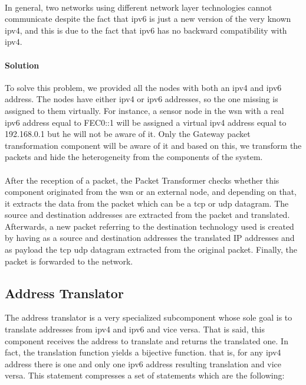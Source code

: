 \documentclass[oneside,12pt,a4paper,final]{book}
\begin{document}
\paragraph{}

In general, two networks using different network layer technologies cannot communicate despite the fact that \gls{ipv6} is just a new version of the very known \gls{ipv4}, and this is due to the fact that \gls{ipv6} has no backward compatibility with \gls{ipv4}.
\paragraph{Solution}
To solve this problem, we provided all the nodes with both an \gls{ipv4} and \gls{ipv6} address. The nodes have either \gls{ipv4} or \gls{ipv6} addresses, so the one missing is assigned to them virtually. For instance, a sensor node in the \gls{wsn} with a real \gls{ipv6} address equal to FEC0::1 will be assigned a virtual \gls{ipv4} address equal to 192.168.0.1 but he will not be aware of it. Only the Gateway packet transformation component will be aware of it and based on this, we transform the packets and hide the heterogeneity from the components of the system.
\paragraph{}
After the reception of a packet, the Packet Transformer checks whether this component originated from the \gls{wsn} or an external node, and depending on that, it extracts the data from the packet which can be a \gls{tcp} or \gls{udp} datagram. The source and destination addresses are extracted from the packet and translated. Afterwards, a new packet referring to the destination technology used is created by having as a source and destination addresses the translated IP addresses and as payload the \gls{tcp} \gls{udp} datagram extracted from the original packet. Finally, the packet is forwarded to the network.
\subsection{Address Translator}
The address translator is a very specialized subcomponent whose sole goal is to translate addresses from \gls{ipv4} and \gls{ipv6} and vice versa. That is said, this component receives the address to translate and returns the translated one. In fact, the translation function yields a bijective function. that is, for any \gls{ipv4} address there is one and only one \gls{ipv6} address resulting translation and vice versa. This statement compresses a set of statements which are the following:
\end{document}
